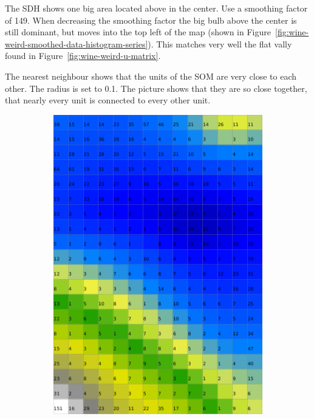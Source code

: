 \documentclass{acm_proc_article-sp}
\begin{document}
The SDH shows one big area located above in the center. Use a smoothing factor of 149.
When decreasing the smoothing factor the big bulb above the center is still dominant,
but moves into the top left of the map (shown in Figure~\ref{fig:wine-weird-smoothed-data-histogram-series}).
This matches very well the flat vally found in
Figure~\ref{fig:wine-weird-u-matrix}.

The nearest neighbour shows that the units of the SOM are very close to each other. The 
radius is set to 0.1. The picture shows that they are so close together, that
nearly every unit is connected to every other unit.

\begin{figure}
    \centering
    \begin{subfigure}[b]{0.45\linewidth}
        \includegraphics[width=\linewidth]{img/wine-weird-activity-histogram}

\end{subfigure}
\end{figure}
\end{document}
